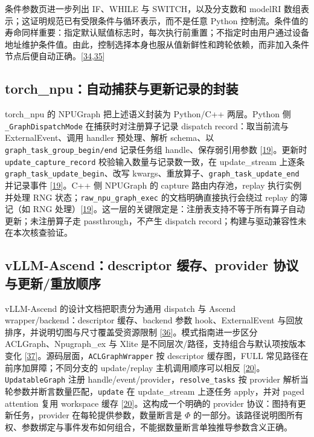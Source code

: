 \documentclass[
  UTF8,
  zihao=5]{ctexart}
\begin{document}
条件参数页进一步列出 IF、WHILE 与 SWITCH，以及分支数和 modelRI
数组表示；这证明规范已有受限条件与循环表示，而不是任意 Python
控制流。条件值的寿命同样重要：指定默认赋值标志时，每次执行前重置；不指定时由用户通过设备地址维护条件值。由此，控制选择本身也服从值新鲜性和跨轮依赖，而非加入条件节点后便自动正确。{[}\protect\hyperlink{ref-audit_cann_cond_params}{34},\protect\hyperlink{ref-audit_cann_cond_create}{35}{]}

\hypertarget{torch_npuux81eaux52a8ux6355ux83b7ux4e0eux66f4ux65b0ux8bb0ux5f55ux7684ux5c01ux88c5}{%
\subsection{torch\_npu：自动捕获与更新记录的封装}\label{torch_npuux81eaux52a8ux6355ux83b7ux4e0eux66f4ux65b0ux8bb0ux5f55ux7684ux5c01ux88c5}}

torch\_npu 的 NPUGraph 把上述语义封装为 Python/C++ 两层。Python 侧
\texttt{\_GraphDispatchMode} 在捕获时对注册算子记录 dispatch
record：取当前流与 ExternalEvent、调用 handler 预处理、解析 schema、以
\texttt{graph\_task\_group\_begin/end} 记录任务组 handle、保存弱引用参数
{[}\protect\hyperlink{ref-torchnpu2026graphs}{19}{]}。更新时
\texttt{update\_capture\_record} 校验输入数量与记录数一致，在
update\_stream 上逐条 \texttt{graph\_task\_update\_begin}、改写
kwargs、重放算子、\texttt{graph\_task\_update\_end} 并记录事件
{[}\protect\hyperlink{ref-torchnpu2026graphs}{19}{]}。C++ 侧 NPUGraph 的
capture 路由内存池，replay 执行实例并处理 RNG
状态；\texttt{raw\_npu\_graph\_exec} 的文档明确直接执行会绕过 replay
的簿记（如 RNG
处理）{[}\protect\hyperlink{ref-torchnpu2026graphs}{19}{]}。这一层的关键限定是：注册表支持不等于所有算子自动更新；未注册算子走
passthrough，不产生 dispatch record；构建与驱动兼容性未在本次核查验证。

\hypertarget{vllm-ascenddescriptor-ux7f13ux5b58provider-ux534fux8baeux4e0eux66f4ux65b0ux91cdux653eux987aux5e8f}{%
\subsection{vLLM-Ascend：descriptor 缓存、provider
协议与更新/重放顺序}\label{vllm-ascenddescriptor-ux7f13ux5b58provider-ux534fux8baeux4e0eux66f4ux65b0ux91cdux653eux987aux5e8f}}

vLLM-Ascend 的设计文档把职责分为通用 dispatch 与 Ascend
wrapper/backend：descriptor 缓存、backend 参数 hook、ExternalEvent
与回放排序，并说明切图与尺寸覆盖受资源限制
{[}\protect\hyperlink{ref-vllmascenddesign}{36}{]}。模式指南进一步区分
ACLGraph、Npugraph\_ex 与 Xlite
是不同层次/路径，支持组合与默认项按版本变化
{[}\protect\hyperlink{ref-vllmascendmode}{37}{]}。源码层面，\texttt{ACLGraphWrapper}
按 descriptor 缓存图，FULL 常见路径在前序加屏障；不同分支的
update/replay 主机调用顺序可以相反
{[}\protect\hyperlink{ref-vllmascend2026impl}{20}{]}。\texttt{UpdatableGraph}
注册 handle/event/provider，\texttt{resolve\_tasks} 按 provider
解析当轮参数并断言数量匹配，\texttt{update} 在 update\_stream 上逐任务
apply，并对 paged attention 复用 workspace 缓存
{[}\protect\hyperlink{ref-vllmascend2026impl}{20}{]}。这构成一个明确的
provider 协议：图持有更新任务，provider 在每轮提供参数，数量断言是
\(\Phi\)
的一部分。该路径说明图所有权、参数绑定与事件发布如何组合，不能据数量断言单独推导参数含义正确。
\end{document}
